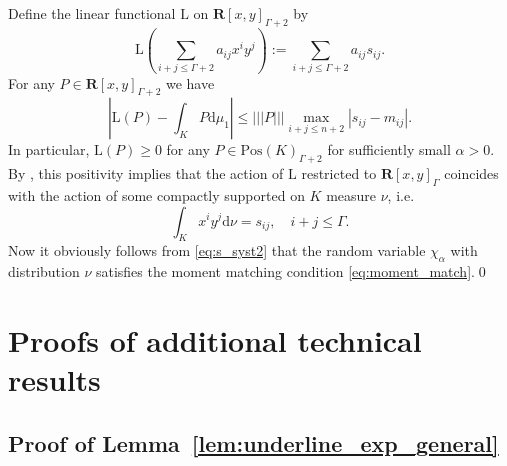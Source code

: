 \documentclass[10pt]{amsart}
\numberwithin{equation}{section}
\newcommand{\dif}{\mathrm{d}}
\newcommand{\R}{\mathbf{R}}
\begin{document}
Define the linear functional $\mathrm{L}$ on $\R[x,y]_{\Gamma+2}$ by
\begin{equation*}
\mathrm{L}\left(\sum_{i+j\le \Gamma+2} a_{ij}x^iy^j\right):= \sum_{i+j\le \Gamma+2} a_{ij} s_{ij}.
\end{equation*}
For any $P\in \R[x,y]_{\Gamma+2}$ we have
\begin{equation*}
\left\vert \mathrm{L}(P) - \int_K P\dif\mu_1\right\vert\le |||P||| \max_{i+j\le n+2} |s_{ij}-m_{ij}|.
\end{equation*}
In particular, $\mathrm{L}(P)\ge 0$ for any $P\in\mathrm{Pos}(K)_{\Gamma+2}$ for sufficiently small $\alpha>0$.  By \cite[Theorem~8.7]{moment_problem}, this positivity implies that the action of $\mathrm{L}$ restricted to $\R[x,y]_\Gamma$  coincides with the action of some compactly supported on $K$ measure $\nu$, i.e. 
\begin{equation*}
\int_K x^iy^j \dif\nu = s_{ij},\quad i+j\le \Gamma.
\end{equation*}
Now it obviously follows from \eqref{eq:s_syst2} that the random variable $\chi_\alpha$ with distribution $\nu$ satisfies the moment matching condition \eqref{eq:moment_match}.\hfill\qed



\appendix

\section{Proofs of additional technical results}


\subsection{Proof of Lemma~\ref{lem:underline_exp_general}}\label{app:underline}
\end{document}
